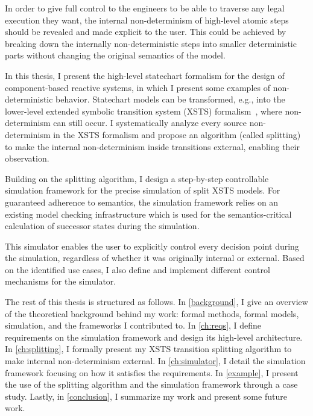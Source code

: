 In order to give full control to the engineers to be able to traverse any legal execution they want, the internal non-determinism of high-level atomic steps should be revealed and made explicit to the user. This could be achieved by breaking down the internally non-deterministic steps into smaller deterministic parts without changing the original semantics of the model.

In this thesis, I present the high-level statechart formalism for the design of component-based reactive systems, in which I present some examples of non-deterministic behavior. Statechart models can be transformed, e.g., into the lower-level extended symbolic transition system (XSTS) formalism~\cite{Gamma}, where non-determinism can still occur. I systematically analyze every source non-determinism in the XSTS formalism and propose an algorithm (called splitting) to make the internal non-determinism inside transitions external, enabling their observation.

Building on the splitting algorithm, I design a step-by-step controllable simulation framework for the precise simulation of split XSTS models. For guaranteed adherence to semantics, the simulation framework relies on an existing model checking infrastructure which is used for the semantics-critical calculation of successor states during the simulation.

This simulator enables the user to explicitly control every decision point during the simulation, regardless of whether it was originally internal or external. Based on the identified use cases, I also define and implement different control mechanisms for the simulator.

The rest of this thesis is structured as follows. In \autoref{background}, I give an overview of the theoretical background behind my work: formal methods, formal models, simulation, and the frameworks I contributed to. In \autoref{ch:reqs}, I define requirements on the simulation framework and design its high-level architecture. In \autoref{ch:splitting}, I formally present my XSTS transition splitting algorithm to make internal non-determinism external. In \autoref{ch:simulator}, I detail the simulation framework focusing on how it satisfies the requirements. In \autoref{example}, I present the use of the splitting algorithm and the simulation framework through a case study. Lastly, in \autoref{conclusion}, I summarize my work and present some future work.
